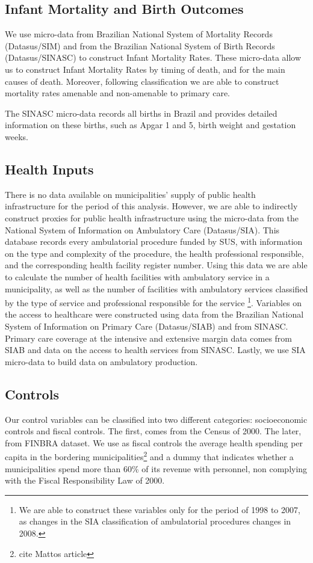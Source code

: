 \subsection{Infant Mortality and Birth Outcomes}

We use micro-data from Brazilian National System of Mortality Records (Datasus/SIM) and from the Brazilian National System of Birth Records (Datasus/SINASC) to construct Infant Mortality Rates. These micro-data allow us to construct Infant Mortality Rates by timing of death, and for the main causes of death. Moreover, following \cite{alfradique2009internaccoes} classification we are able to construct mortality rates amenable and non-amenable to primary care.

The SINASC micro-data records all births in Brazil and provides detailed information on these births, such as Apgar 1 and 5, birth weight and gestation weeks.

\subsection{Health Inputs}

There is no data available on municipalities' supply of public health infrastructure for the period of this analysis. However, we are able to indirectly construct proxies for public health infrastructure using the micro-data from the National System of Information on Ambulatory Care (Datasus/SIA). This database records every ambulatorial procedure funded by SUS, with information on the type and complexity of the procedure, the health professional responsible, and the corresponding health facility register number. Using this data we are able to calculate the number of health facilities with ambulatory service in a municipality, as well as the number of facilities with ambulatory services classified by the type of service and professional responsible for the service \footnote{We are able to construct these variables only for the period of 1998 to 2007, as changes in the SIA classification of ambulatorial procedures changes in 2008.}. Variables on the access to healthcare were constructed using data from the Brazilian National System of Information on Primary Care (Datasus/SIAB) and from SINASC. Primary care coverage at the intensive and extensive margin data comes from SIAB and data on the access to health services from SINASC. Lastly, we use SIA micro-data to build data on ambulatory production.

\subsection{Controls}

Our control variables can be classified into two different categories: socioeconomic controls and fiscal controls. The first, comes from the Census of 2000. The later, from FINBRA dataset. We use as fiscal controls the average health spending per capita in the bordering municipalities\footnote{cite Mattos article} and a dummy that indicates whether a municipalities spend more than 60\% of its revenue with personnel, non complying with the Fiscal Responsibility Law of 2000.

